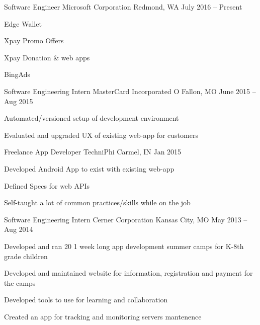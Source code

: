 \documentclass[]{awesome-cv}
\begin{document}
\begin{cventries}
	\cventry
	{Software Engineer}
	{Microsoft Corporation}
	{Redmond, WA}
	{July 2016 – Present}
	{\begin{cvitems}
		\item {Edge Wallet}
		\item {Xpay Promo Offers}
		\item {Xpay Donation \& web apps}
		\item {BingAds} %
	\end{cvitems}}
	\cventry
	{Software Engineering Intern}
	{MasterCard Incorporated}
	{O Fallon, MO}
	{June 2015 – Aug 2015}
	{\begin{cvitems}
		\item {Automated/versioned setup of development environment}
		\item {Evaluated and upgraded UX of existing web-app for customers}
		\end{cvitems}}
	\cventry
	{Freelance App Developer}
	{TechniPhi}
	{Carmel, IN}
	{Jan 2015}
	{\begin{cvitems}
		\item {Developed Android App to exist with existing web-app}
		\item {Defined Specs for web APIs}
		\item {Self-taught a lot of common practices/skills while on the job} %
		\end{cvitems}}
	\cventry
	{Software Engineering Intern}
	{Cerner Corporation}
	{Kansas City, MO}
	{May 2013 – Aug 2014}
	{\begin{cvitems}
		\item {Developed and ran 20 1 week long app development summer camps for K-8th grade children}
		\item {Developed and maintained website for information, registration and payment for the camps}
		\item {Developed tools to use for learning and collaboration}
		\item {Created an app for tracking and monitoring servers mantenence}
		\end{cvitems}}
\end{cventries}

\vspace*{0mm}
\end{document}
